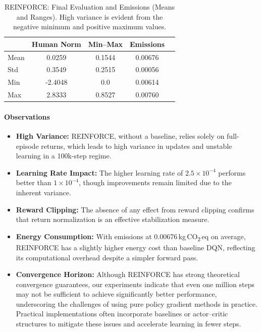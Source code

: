 \begin{table}
	\caption{REINFORCE: Final Evaluation and Emissions (Means and Ranges). 
		High variance is evident from the negative minimum and positive maximum values.}
	\label{tab:reinforce_evalstats}
	\centering
	\begin{tabular}{lcccc}
		\toprule
		& \textbf{Human Norm} & \textbf{Min--Max} & \textbf{Emissions} \\
		\midrule
		Mean & 0.0259 & 0.1544 & 0.00676 \\
		Std  & 0.3549 & 0.2515 & 0.00056 \\
		Min  & -2.4048 & 0.0    & 0.00614 \\
		Max  & 2.8333 & 0.8527 & 0.00760 \\
		\bottomrule
	\end{tabular}
\end{table}

\paragraph{Observations}
\begin{itemize}
	\item \textbf{High Variance:} REINFORCE, without a baseline, relies solely on full-episode returns, which leads to high variance in updates and unstable learning in a 100k-step regime.
	\item \textbf{Learning Rate Impact:} The higher learning rate of $2.5\times10^{-4}$ performs better than $1\times10^{-4}$, though improvements remain limited due to the inherent variance.
	\item \textbf{Reward Clipping:} The absence of any effect from reward clipping confirms that return normalization is an effective stabilization measure.
	\item \textbf{Energy Consumption:} With emissions at \num{0.00676}\,kg\,CO\textsubscript{2}\,eq on average, REINFORCE has a slightly higher energy cost than baseline DQN, reflecting its computational overhead despite a simpler forward pass.
	\item \textbf{Convergence Horizon:} Although REINFORCE has strong theoretical convergence guarantees, our experiments indicate that even one million steps may not be sufficient to achieve significantly better performance, underscoring the challenges of using pure policy gradient methods in practice. Practical implementations often incorporate baselines or actor–critic structures to mitigate these issues and accelerate learning in fewer steps.
\end{itemize}

